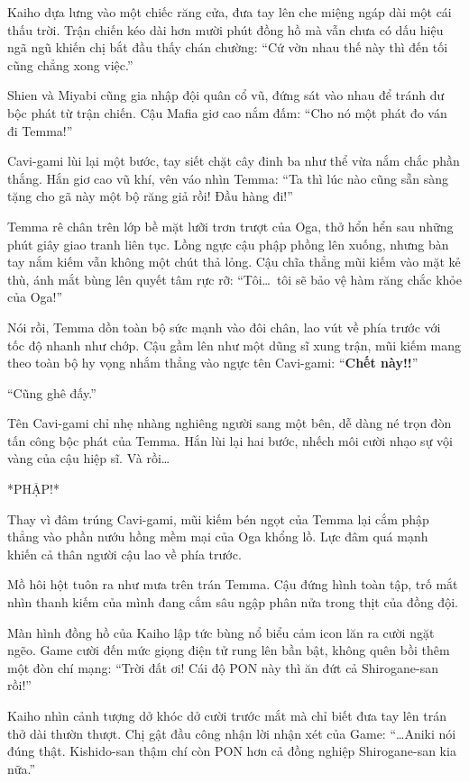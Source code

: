 \documentclass[../main.tex]{subfiles}
\begin{document}
Kaiho dựa lưng vào một chiếc răng cửa, đưa tay lên che miệng ngáp dài một cái thấu trời. Trận chiến kéo dài hơn mười phút đồng hồ mà vẫn chưa có dấu hiệu ngã ngũ khiến chị bắt đầu thấy chán chường: ``Cứ vờn nhau thế này thì đến tối cũng chẳng xong việc.''

Shien và Miyabi cũng gia nhập đội quân cổ vũ, đứng sát vào nhau để tránh dư bộc phát từ trận chiến. Cậu Mafia giơ cao nắm đấm: ``Cho nó một phát đo ván đi Temma!''

Cavi-gami lùi lại một bước, tay siết chặt cây đinh ba như thể vừa nắm chắc phần thắng. Hắn giơ cao vũ khí, vên váo nhìn Temma: ``Ta thì lúc nào cũng sẵn sàng tặng cho gã này một bộ răng giả rồi! Đầu hàng đi!''

Temma rê chân trên lớp bề mặt lưỡi trơn trượt của Oga, thở hổn hển sau những phút giây giao tranh liên tục. Lồng ngực cậu phập phồng lên xuống, nhưng bàn tay nắm kiếm vẫn không một chút thả lỏng. Cậu chĩa thẳng mũi kiếm vào mặt kẻ thù, ánh mắt bùng lên quyết tâm rực rỡ: ``Tôi\dots\ tôi sẽ bảo vệ hàm răng chắc khỏe của Oga!''

Nói rồi, Temma dồn toàn bộ sức mạnh vào đôi chân, lao vút về phía trước với tốc độ nhanh như chớp. Cậu gầm lên như một dũng sĩ xung trận, mũi kiếm mang theo toàn bộ hy vọng nhắm thẳng vào ngực tên Cavi-gami: ``\textbf{Chết này!!}''

``Cũng ghê đấy.''

Tên Cavi-gami chỉ nhẹ nhàng nghiêng người sang một bên, dễ dàng né trọn đòn tấn công bộc phát của Temma. Hắn lùi lại hai bước, nhếch môi cười nhạo sự vội vàng của cậu hiệp sĩ. Và rồi\dots

*PHẬP!*

Thay vì đâm trúng Cavi-gami, mũi kiếm bén ngọt của Temma lại cắm phập thẳng vào phần nướu hồng mềm mại của Oga khổng lồ. Lực đâm quá mạnh khiến cả thân người cậu lao về phía trước.


Mồ hôi hột tuôn ra như mưa trên trán Temma. Cậu đứng hình toàn tập, trố mắt nhìn thanh kiếm của mình đang cắm sâu ngập phân nửa trong thịt của đồng đội.

Màn hình đồng hồ của Kaiho lập tức bùng nổ biểu cảm icon lăn ra cười ngặt ngẽo. Game cười đến mức giọng điện tử rung lên bần bật, không quên bồi thêm một đòn chí mạng: ``Trời đất ơi! Cái độ PON này thì ăn đứt cả Shirogane-san rồi!''

Kaiho nhìn cảnh tượng dở khóc dở cười trước mắt mà chỉ biết đưa tay lên trán thở dài thườn thượt. Chị gật đầu công nhận lời nhận xét của Game: ``\dots Aniki nói đúng thật. Kishido-san thậm chí còn PON hơn cả đồng nghiệp Shirogane-san kia nữa.''
\end{document}
